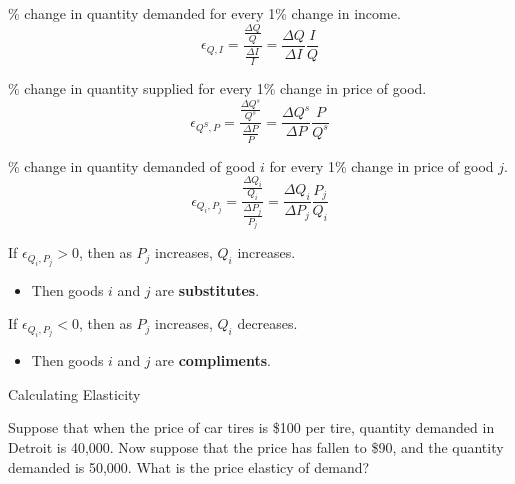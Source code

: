 \documentclass[12pt,t]{beamer}
\begin{document}
\begin{frame}
  
  \bigskip
  \% change in quantity demanded for every 1\% change in income.
  $$
    \epsilon_{Q,I} = \frac{\frac{\Delta Q}{Q}}{\frac{\Delta I}{I}} = \frac{\Delta Q}{\Delta I}\frac{I}{Q}
  $$

  \bigskip
  
  \bigskip
  \% change in quantity supplied for every 1\% change in price of good.
  $$
    \epsilon_{Q^S,P} = \frac{\frac{\Delta Q^s}{Q^s}}{\frac{\Delta P}{P}} = \frac{\Delta Q^s}{\Delta P}\frac{P}{Q^s}
  $$
\end{frame}

\begin{frame}
  
  \bigskip
  \% change in quantity demanded of good $i$ for every 1\% change in price of good $j$.
  $$
    \epsilon_{Q_i,P_j}= \frac{\frac{\Delta Q_i}{Q_i}}{\frac{\Delta P_j}{P_j}}=\frac{\Delta Q_i}{\Delta P_j}\frac{P_j}{Q_i}
  $$
  
  \pause\bigskip
  If $\epsilon_{Q_i,P_j}>0$, then as $P_j$ increases, $Q_i$ increases.
  \begin{itemize}
    \item Then goods $i$ and $j$ are \textbf{substitutes}.
  \end{itemize}
  
  \pause\bigskip
  If $\epsilon_{Q_i,P_j}<0$, then as $P_j$ increases, $Q_i$ decreases.
  \begin{itemize}
    \item Then goods $i$ and $j$ are \textbf{compliments}.
  \end{itemize}
\end{frame}

\begin{frame}{Calculating Elasticity}

\bigskip
Suppose that when the price of car tires is \$100 per tire, quantity demanded in Detroit is 40,000. Now suppose that the price has fallen to \$90, and the quantity demanded is 50,000. What is the price elasticy of demand?


\end{frame}
\end{document}
